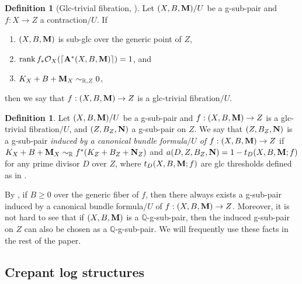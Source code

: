 \documentclass[11pt]{amsart}
\numberwithin{equation}{section}
\newcommand{\Mm}{{\bf{M}}}
\newcommand{\NN}{{\bf{N}}}
\newcommand{\Qq}{\mathbb{Q}}
\newcommand{\Rr}{\mathbb{R}}
\newcommand{\rk}{\operatorname{rank}}
\newcommand{\Aa}{{\bf{A}}}
\theoremstyle{definition}
\newtheorem{defn}[thm]{Definition}
\theoremstyle{definition}
\theoremstyle{definition}
\begin{document}
\begin{defn}[Glc-trivial fibration, {\cite[Definition 2.10]{JLX22}}]
  Let $(X,B,\Mm)/U$ be a g-sub-pair and $f: X\rightarrow Z$ a
  contraction$/U$. If
  \begin{enumerate}
    \item $(X,B,\Mm)$ is sub-glc over the generic point of $Z$,
    \item $\rk f_*\mathcal{O}_X(\lceil\Aa^*(X,B,\Mm)\rceil)=1$, and
    \item $K_X+B+\Mm_X\sim_{\Rr,Z}0$,
  \end{enumerate}
  then we say that $f: (X,B,\Mm)\rightarrow Z$ is a glc-trivial fibration$/U$.
\end{defn}

\begin{defn}
  Let $(X,B,\Mm)/U$ be a g-sub-pair and $f: (X,B,\Mm)\rightarrow Z$
  is a glc-trivial fibration$/U$, and $(Z,B_Z,\NN)$ a g-sub-pair on
  $Z$. We say that $(Z,B_Z,\NN)$ is a g-sub-pair \emph{induced by a
  canonical bundle formula$/U$ of} $f: (X,B,\Mm)\rightarrow Z$ if
  $K_X+B+\Mm_X\sim_{\mathbb R}f^*(K_Z+B_Z+\NN_Z)$ and
  $a(D,Z,B_Z,\NN)=1-t_D(X,B,\Mm;f)$ for any prime divisor $D$ over
  $Z$, where $t_D(X,B,\Mm;f)$ are glc thresholds defined as in
  \cite[Definition 2.12]{JLX22}.

  By \cite[Theorem 2.23]{JLX22}, if $B\geq 0$ over the generic fiber
  of $f$, then there always exists a g-sub-pair induced by a
  canonical bundle formula$/U$ of $f: (X,B,\Mm)\rightarrow Z$.
  Moreover, it is not hard to see that if $(X,B,\Mm)$ is a
  $\Qq$-g-sub-pair, then the induced g-sub-pair on $Z$ can also be
  chosen as a $\Qq$-g-sub-pair. We will frequently use these facts in
  the rest of the paper.
\end{defn}

\subsection{Crepant log structures}
\end{document}
